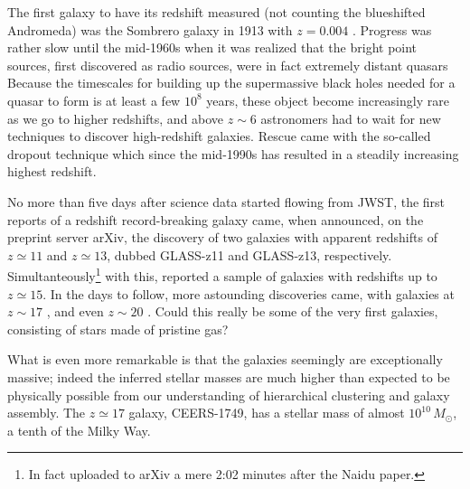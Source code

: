 \documentclass[useAMS,usenatbib,bibyear]{aa}
\begin{document}
The first galaxy to have its redshift measured (not counting the blueshifted Andromeda) was the Sombrero galaxy in 1913 with $z=0.004$ \citep{Slipher1915,Hoyt1980}. Progress was rather slow until the mid-1960s when it was realized that the bright point sources, first discovered as radio sources, were in fact extremely distant quasars \citep{Schmidt1964,Schmidt1965}
Because the timescales for building up the supermassive black holes needed for a quasar to form is at least a few $10^8$ years, these object become increasingly rare as we go to higher redshifts, and above $z\sim6$ astronomers had to wait for new techniques to discover high-redshift galaxies.
Rescue came with the so-called dropout technique \citep{Steidel1996} which since the mid-1990s has resulted in a steadily increasing highest redshift.

No more than five days after science data started flowing from JWST, the first reports of a redshift record-breaking galaxy came, when \citet{Naidu2022a} announced, on the preprint server arXiv, the discovery of two galaxies with apparent redshifts of $z\simeq11$ and $z\simeq13$, dubbed GLASS-z11 and GLASS-z13, respectively.
Simultanteously\footnote{In fact uploaded to arXiv a mere 2:02 minutes after the Naidu paper.} with this, \citet{Castellano2022} reported a sample of galaxies with redshifts up to $z\simeq15$.
In the days to follow, more astounding discoveries came, with galaxies at
$z\sim17$ \citep{Donnan2022,Harikane2022}, and even
$z\sim20$ \citep{Yan2022}.
Could this really be some of the very first galaxies, consisting of stars made of pristine gas?

What is even more remarkable is that the galaxies seemingly are exceptionally massive; indeed the inferred stellar masses are much higher than expected to be physically possible from our understanding of hierarchical clustering and galaxy assembly.
The $z\simeq17$ galaxy, CEERS-1749, has a stellar mass of almost $10^{10}\,M_\odot$, a tenth of the Milky Way.
\end{document}
